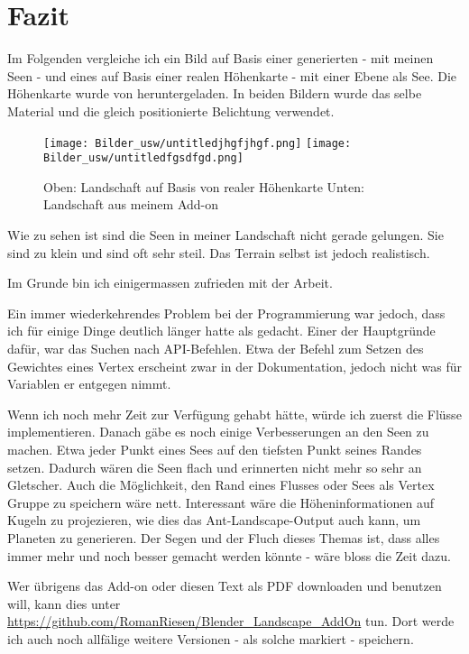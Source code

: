 \documentclass[12pt,twoside]{book}
\begin{document}
\chapter{Fazit}

Im Folgenden vergleiche ich ein Bild auf Basis einer generierten - mit meinen Seen - und eines auf Basis einer realen H\"ohenkarte - mit einer Ebene als See. Die H\"ohenkarte wurde von \cite{Terrain} heruntergeladen.
In beiden Bildern wurde das selbe Material und die gleich positionierte Belichtung verwendet. 
\begin{figure}[H]
\centering

\texttt{[image: Bilder\_usw/untitledjhgfjhgf.png]}
\texttt{[image: Bilder\_usw/untitledfgsdfgd.png]}

 \caption{Oben: Landschaft auf Basis von realer H\"ohenkarte Unten: Landschaft aus meinem Add-on}
  \label{fig:Node}
\centering
\end{figure}
Wie zu sehen ist sind die Seen in meiner Landschaft nicht gerade gelungen. Sie sind zu klein und sind oft sehr steil.
Das Terrain selbst ist jedoch realistisch.

Im Grunde bin ich einigermassen zufrieden mit der Arbeit.

Ein immer wiederkehrendes Problem bei der Programmierung war jedoch, dass ich f\"ur einige Dinge deutlich l\"anger hatte als gedacht. Einer der Hauptgr\"unde daf\"ur, war das Suchen nach API-Befehlen. Etwa der Befehl zum Setzen des Gewichtes eines Vertex erscheint zwar in der Dokumentation, jedoch nicht was f\"ur Variablen er entgegen nimmt. 



Wenn ich noch mehr Zeit zur Verf\"ugung gehabt h\"atte, w\"urde ich zuerst die Fl\"usse implementieren. Danach g\"abe es noch einige Verbesserungen an den Seen zu machen. Etwa  jeder Punkt eines Sees auf den tiefsten Punkt seines Randes setzen. Dadurch w\"aren die Seen flach und erinnerten nicht mehr so sehr an Gletscher. Auch die M\"oglichkeit, den Rand eines Flusses oder Sees als Vertex Gruppe zu speichern w\"are nett. 
Interessant w\"are die H\"oheninformationen auf Kugeln zu projezieren, wie dies das \glqq Ant-Landscape\grqq-Output auch kann, um Planeten zu generieren.
Der Segen und der Fluch dieses Themas ist, dass alles immer mehr und noch besser gemacht werden k\"onnte - w\"are bloss die Zeit dazu.


Wer \"ubrigens das Add-on oder diesen Text als PDF downloaden und benutzen will, kann dies unter \url{https://github.com/RomanRiesen/Blender_Landscape_AddOn} tun. Dort werde ich auch noch allf\"alige weitere Versionen - als solche markiert - speichern.
\end{document}
